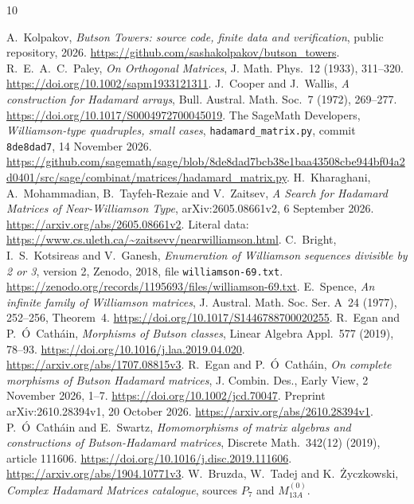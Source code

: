 \documentclass[10pt]{article}
\begin{document}
\begin{thebibliography}{10}\footnotesize\raggedright
\setlength{\itemsep}{0pt}\setlength{\parsep}{0pt}
A.~Kolpakov, \emph{Butson Towers: source code, finite data and verification},
public repository, 2026.
\url{https://github.com/sashakolpakov/butson_towers}.
R.~E.~A.~C.~Paley, \emph{On Orthogonal Matrices},
J. Math. Phys.\ 12 (1933), 311--320.
\url{https://doi.org/10.1002/sapm1933121311}.
J.~Cooper and J.~Wallis,
\emph{A construction for Hadamard arrays}, Bull. Austral. Math. Soc.\ 7 (1972), 269--277.
\url{https://doi.org/10.1017/S0004972700045019}.
The SageMath Developers, \emph{Williamson-type quadruples, small cases},
\texttt{hadamard\_matrix.py}, commit \texttt{8de8dad7}, 14 November 2026.
\url{https://github.com/sagemath/sage/blob/8de8dad7bcb38e1baa43508cbe944bf04a2d0401/src/sage/combinat/matrices/hadamard_matrix.py}.
H.~Kharaghani, A.~Mohammadian, B.~Tayfeh-Rezaie and V.~Zaitsev,
\emph{A Search for Hadamard Matrices of Near-Williamson Type},
arXiv:2605.08661v2, 6 September 2026.
\url{https://arxiv.org/abs/2605.08661v2}.
Literal data: \url{https://www.cs.uleth.ca/~zaitsevv/nearwilliamson.html}.
C.~Bright, I.~S.~Kotsireas and V.~Ganesh,
\emph{Enumeration of Williamson sequences divisible by 2 or 3},
version 2, Zenodo, 2018, file \texttt{williamson-69.txt}.
\url{https://zenodo.org/records/1195693/files/williamson-69.txt}.
E.~Spence, \emph{An infinite family of Williamson matrices},
J. Austral. Math. Soc. Ser. A\ 24 (1977), 252--256, Theorem~4.
\url{https://doi.org/10.1017/S1446788700020255}.
R.~Egan and P.~\'{O}~Cath\'ain,
\emph{Morphisms of Butson classes}, Linear Algebra Appl.\ 577 (2019), 78--93.
\url{https://doi.org/10.1016/j.laa.2019.04.020}.
\url{https://arxiv.org/abs/1707.08815v3}.
R.~Egan and P.~\'{O}~Cath\'ain,
\emph{On complete morphisms of Butson Hadamard matrices},
J. Combin. Des., Early View, 2 November 2026, 1--7.
\url{https://doi.org/10.1002/jcd.70047}.
Preprint arXiv:2610.28394v1, 20 October 2026.
\url{https://arxiv.org/abs/2610.28394v1}.
P.~\'{O}~Cath\'ain and E.~Swartz,
\emph{Homomorphisms of matrix algebras and constructions of Butson-Hadamard matrices},
Discrete Math.\ 342(12) (2019), article 111606.
\url{https://doi.org/10.1016/j.disc.2019.111606}.
\url{https://arxiv.org/abs/1904.10771v3}.
W.~Bruzda, W.~Tadej and K.~\.{Z}yczkowski,
\emph{Complex Hadamard Matrices catalogue}, sources $P_7$ and $M_{13A}^{(0)}$.

\end{thebibliography}
\end{document}
